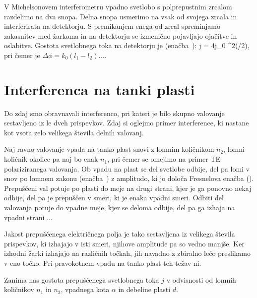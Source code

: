 V Michelsonovem interferometru vpadno svetlobo s polprepustnim zrcalom razdelimo 
na dva snopa. Delna snopa usmerimo na  vsak od svojega zrcala in interferirata na detektorju. 
S premikanjem enega od zrcal spreminjamo
zakasnitev med žarkoma in na detektorju se izmenično pojavljajo ojačitve in oslabitve.
Gostota svetlobnega toka na detektorju je (enačba~):
\beq
j = 4j_0 \cos^2(\Delta \phi/2),
\label{eq:06_24}
\eeq
pri čemer je $\Delta \phi = k_0(l_1-l_2)$....


\section{Interferenca na tanki plasti}
Do zdaj smo obravnavali interferenco, pri kateri je bilo skupno valovanje sestavljeno iz le 
dveh prispevkov. Zdaj si oglejmo primer interference, ki nastane kot vsota zelo velikega 
števila delnih valovanj. 

Naj ravno valovanje vpada na tanko plast snovi z lomnim količnikom $n_2$, lomni količnik 
okolice pa naj bo enak $n_1$, pri čemer se omejimo na primer TE polariziranega valovanja.
Ob vpadu na plast se del svetlobe odbije, del pa lomi v snov po lomnem zakonu (enačba~) 
z amplitudo, ki jo določa Fresnelova enačba (). Prepuščeni val potuje po plasti do meje
na drugi strani, kjer je ga ponovno nekaj odbije, del pa je prepuščen v smeri, ki 
je enaka vpadni smeri. Odbiti del valovanja potuje 
do vpadne meje, kjer se deloma odbije, del pa ga izhaja na vpadni strani ... 

Jakost prepuščenega električnega polja je tako sestavljena iz velikega števila prispevkov, ki 
izhajajo v isti smeri, njihove amplitude pa so vedno manjše. Ker izhodni žarki 
izhajajo na različnih točkah, jih navadno z zbiralno lečo preslikamo v eno točko. Pri pravokotnem
vpadu na tanko plast teh težav ni. 

Zanima nas gostota prepuščenega svetlobnega toka $j$ v odvisnosti od 
lomnih količnikov $n_1$ in $n_2$, vpadnega kota $\alpha$ in debeline plasti $d$. 

